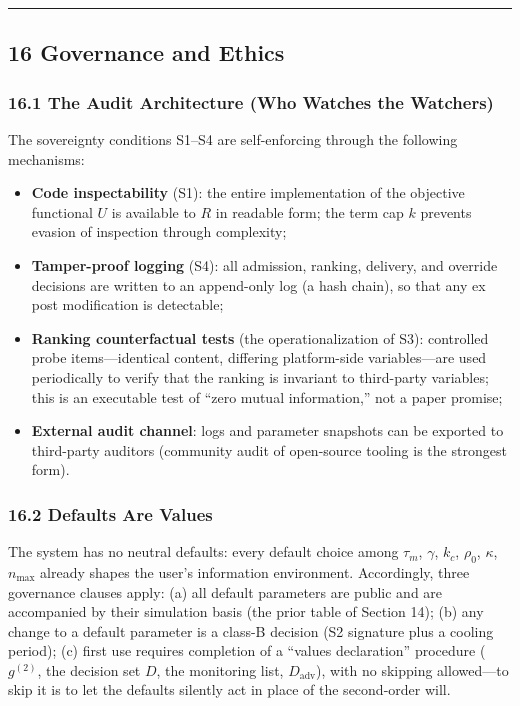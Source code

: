 \documentclass[
  11pt]{article}
\providecommand{\tightlist}{%
  \setlength{\itemsep}{0pt}\setlength{\parskip}{0pt}}
\begin{document}
\begin{center}\rule{0.5\linewidth}{0.5pt}\end{center}

\subsection{16 Governance and Ethics}\label{governance-and-ethics}

\subsubsection{16.1 The Audit Architecture (Who Watches the
Watchers)}\label{the-audit-architecture-who-watches-the-watchers}

The sovereignty conditions S1--S4 are self-enforcing through the
following mechanisms:

\begin{itemize}
\tightlist
\item
  \textbf{Code inspectability} (S1): the entire implementation of the
  objective functional \(U\) is available to \(R\) in readable form; the
  term cap \(k\) prevents evasion of inspection through complexity;
\item
  \textbf{Tamper-proof logging} (S4): all admission, ranking, delivery,
  and override decisions are written to an append-only log (a hash
  chain), so that any ex post modification is detectable;
\item
  \textbf{Ranking counterfactual tests} (the operationalization of S3):
  controlled probe items---identical content, differing platform-side
  variables---are used periodically to verify that the ranking is
  invariant to third-party variables; this is an executable test of
  ``zero mutual information,'' not a paper promise;
\item
  \textbf{External audit channel}: logs and parameter snapshots can be
  exported to third-party auditors (community audit of open-source
  tooling is the strongest form).
\end{itemize}

\subsubsection{16.2 Defaults Are Values}\label{defaults-are-values}

The system has no neutral defaults: every default choice among
\(\tau_m\), \(\gamma\), \(k_c\), \(\rho_0\), \(\kappa\), \(n_{\max}\)
already shapes the user's information environment. Accordingly, three
governance clauses apply: (a) all default parameters are public and are
accompanied by their simulation basis (the prior table of Section 14);
(b) any change to a default parameter is a class-B decision (S2
signature plus a cooling period); (c) first use requires completion of a
``values declaration'' procedure (\(g^{(2)}\), the decision set \(D\),
the monitoring list, \(D_{\mathrm{adv}}\)), with no skipping
allowed---to skip it is to let the defaults silently act in place of the
second-order will.
\end{document}
